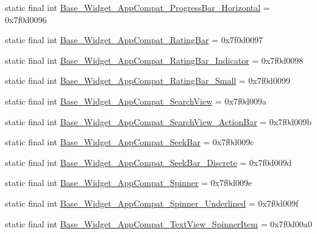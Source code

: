 \begin{DoxyCompactItemize}
\item 
static final int \mbox{\hyperlink{classandroid_1_1support_1_1design_1_1_r_1_1style_abc208c47da65fac306b8bd7d3296541b}{Base\+\_\+\+Widget\+\_\+\+App\+Compat\+\_\+\+Progress\+Bar\+\_\+\+Horizontal}} = 0x7f0d0096
\item 
static final int \mbox{\hyperlink{classandroid_1_1support_1_1design_1_1_r_1_1style_aeb00a759a3ab19c1053273d89650332b}{Base\+\_\+\+Widget\+\_\+\+App\+Compat\+\_\+\+Rating\+Bar}} = 0x7f0d0097
\item 
static final int \mbox{\hyperlink{classandroid_1_1support_1_1design_1_1_r_1_1style_a114549220794f5cf8da42886c05c022b}{Base\+\_\+\+Widget\+\_\+\+App\+Compat\+\_\+\+Rating\+Bar\+\_\+\+Indicator}} = 0x7f0d0098
\item 
static final int \mbox{\hyperlink{classandroid_1_1support_1_1design_1_1_r_1_1style_a7cdc7d47a673704484633b1521a1c956}{Base\+\_\+\+Widget\+\_\+\+App\+Compat\+\_\+\+Rating\+Bar\+\_\+\+Small}} = 0x7f0d0099
\item 
static final int \mbox{\hyperlink{classandroid_1_1support_1_1design_1_1_r_1_1style_afc9c2fe90f72204a9993c2ea0c330d0f}{Base\+\_\+\+Widget\+\_\+\+App\+Compat\+\_\+\+Search\+View}} = 0x7f0d009a
\item 
static final int \mbox{\hyperlink{classandroid_1_1support_1_1design_1_1_r_1_1style_ac5099d28ea4e2f3af04743b760fad8ec}{Base\+\_\+\+Widget\+\_\+\+App\+Compat\+\_\+\+Search\+View\+\_\+\+Action\+Bar}} = 0x7f0d009b
\item 
static final int \mbox{\hyperlink{classandroid_1_1support_1_1design_1_1_r_1_1style_a4da6bd27a198f591c6b7570a8394278c}{Base\+\_\+\+Widget\+\_\+\+App\+Compat\+\_\+\+Seek\+Bar}} = 0x7f0d009c
\item 
static final int \mbox{\hyperlink{classandroid_1_1support_1_1design_1_1_r_1_1style_a857ec0e91e96006f5c182d7bbcfd9dd7}{Base\+\_\+\+Widget\+\_\+\+App\+Compat\+\_\+\+Seek\+Bar\+\_\+\+Discrete}} = 0x7f0d009d
\item 
static final int \mbox{\hyperlink{classandroid_1_1support_1_1design_1_1_r_1_1style_a2984eaba42ecd51a2ba4c50d4fc4d532}{Base\+\_\+\+Widget\+\_\+\+App\+Compat\+\_\+\+Spinner}} = 0x7f0d009e
\item 
static final int \mbox{\hyperlink{classandroid_1_1support_1_1design_1_1_r_1_1style_aeea6f9131a92e96a6130437765238642}{Base\+\_\+\+Widget\+\_\+\+App\+Compat\+\_\+\+Spinner\+\_\+\+Underlined}} = 0x7f0d009f
\item 
static final int \mbox{\hyperlink{classandroid_1_1support_1_1design_1_1_r_1_1style_a7682f5a21cba08ffd067009c829c4e14}{Base\+\_\+\+Widget\+\_\+\+App\+Compat\+\_\+\+Text\+View\+\_\+\+Spinner\+Item}} = 0x7f0d00a0

\end{DoxyCompactItemize}
